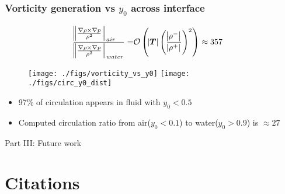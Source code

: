 \begin{frame} \frametitle{Vorticity generation vs $y_0$ across interface}
{\scriptsize
  \begin{align}%
    \label{eq:baroclinic_air_water}%
    \frac{\norm{\frac{\nabla\rho\times\nabla p}{\rho^2}}_{air\quad}}{\norm{\frac{\nabla\rho\times\nabla p}{\rho^2}}_{water}}%
    =&\orderof{\abs{\boldsymbol{T}}\left(\frac{\abs{\rho^-}}{\abs{\rho^+}}\right)^2}%
    \approx 357
  \end{align}
  \vspace*{-.5cm}
  \begin{figure}
    \hfill
    \texttt{[image: ./figs/vorticity\_vs\_y0]} \hfill
    \texttt{[image: ./figs/circ\_y0\_dist]}
    \hfill
  \end{figure}
  \vspace*{-.5cm}
  \begin{itemize}
    \item 97\% of circulation appears in fluid with $y_0<0.5$
    \item Computed circulation ratio from air($y_0<0.1$) to water($y_0>0.9$) is $\approx 27$
  \end{itemize}
}
\end{frame}
\begin{frame}
  \centering
  \begin{center}
    \LARGE Part III: Future work
  \end{center}
\end{frame}


\section{Citations}














